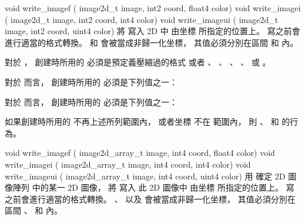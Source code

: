 void write_imagef (
	image2d_t image,
	int2 coord,
	float4 color)
void write_imagei (
	image2d_t image,
	int2 coord,
	int4 color)
void write_imageui (
	image2d_t image,
	int2 coord,
	uint4 color)
\stopbuffer
{}
將  寫入 2D   中
由坐標  所指定的位置上。
寫之前會進行適當的格式轉換。
 和  會被當成非歸一化坐標，
其值必須分別在區間 
和  內。

對於 ，
創建時所用的  必須是預定義壓縮過的格式
或者 、 、 、
 、  或 。

對於  而言，
創建時所用的  必須是下列值之一：
\startigBase
\item {}
\item {}
\item {}
\stopigBase

對於  而言，
創建時所用的  必須是下列值之一：
\startigBase
\item {}
\item {}
\item {}
\stopigBase

如果創建時所用的  不再上述所列範圍內，
或者坐標  不在  範圍內，
則 、  和  的行為。
\stopbuffer

void write_imagef (
	image2d_array_t image,
	int4 coord,
	float4 color)
void write_imagei (
	image2d_array_t image,
	int4 coord,
	int4 color)
void write_imageui (
	image2d_array_t image,
	int4 coord,
	uint4 color)
\stopbuffer
{}
用  確定 2D 圖像陣列  中的某一 2D 圖像，
將  寫入 此 2D 圖像中
由坐標  所指定的位置上。
寫之前會進行適當的格式轉換。
、  以及  會被當成非歸一化坐標，
其值必須分別在區間 、
 和  內。

